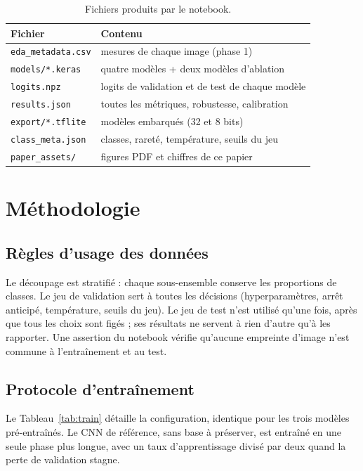 \documentclass[conference]{IEEEtran}
\begin{document}
\begin{table}[!htb]
\caption{Fichiers produits par le notebook.}
\label{tab:artefacts}
\centering\scriptsize\setlength{\tabcolsep}{3pt}
\begin{tabularx}{\columnwidth}{@{}lL@{}}
\toprule
Fichier & Contenu\\
\midrule
\texttt{eda\_metadata.csv} & mesures de chaque image (phase 1)\\
\texttt{models/*.keras} & quatre modèles + deux modèles d'ablation\\
\texttt{logits.npz} & logits de validation et de test de chaque modèle\\
\texttt{results.json} & toutes les métriques, robustesse, calibration\\
\texttt{export/*.tflite} & modèles embarqués (32 et 8 bits)\\
\texttt{class\_meta.json} & classes, rareté, température, seuils du jeu\\
\texttt{paper\_assets/} & figures PDF et chiffres de ce papier\\
\bottomrule
\end{tabularx}
\end{table}

\section{Méthodologie}\label{sec:method}
\subsection{Règles d'usage des données}
Le découpage est stratifié : chaque sous-ensemble conserve les proportions de classes. Le jeu de validation sert à toutes les décisions (hyperparamètres, arrêt anticipé, température, seuils du jeu). Le jeu de test n'est utilisé qu'une fois, après que tous les choix sont figés ; ses résultats ne servent à rien d'autre qu'à les rapporter. Une assertion du notebook vérifie qu'aucune empreinte d'image n'est commune à l'entraînement et au test.

\subsection{Protocole d'entraînement}
Le Tableau~\ref{tab:train} détaille la configuration, identique pour les trois modèles pré-entraînés. Le CNN de référence, sans base à préserver, est entraîné en une seule phase plus longue, avec un taux d'apprentissage divisé par deux quand la perte de validation stagne.
\end{document}

